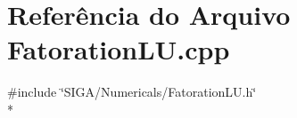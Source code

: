 \section{Referência do Arquivo Fatoration\+L\+U.\+cpp}
\label{_fatoration_l_u_8cpp}
{\ttfamily \#include \char`\"{}S\+I\+G\+A/\+Numericals/\+Fatoration\+L\+U.\+h\char`\"{}}\\*
